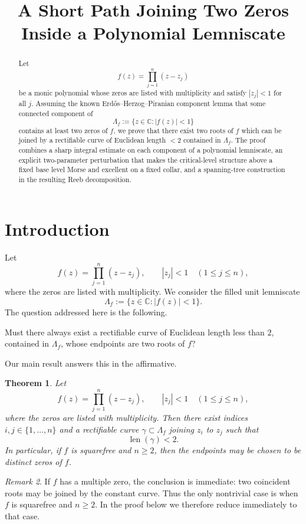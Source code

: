 \documentclass[12pt]{amsart}
\title{A Short Path Joining Two Zeros Inside a Polynomial Lemniscate}
\theoremstyle{definition}
\newtheorem{theorem}{Theorem}
\theoremstyle{remark}
\newtheorem{remark}[theorem]{Remark}
\begin{document}
\begin{abstract}
Let
\[
 f(z)=\prod_{j=1}^n (z-z_j)
\]
be a monic polynomial whose zeros are listed with multiplicity and satisfy $|z_j|<1$ for all $j$.
Assuming the known Erd\H{o}s--Herzog--Piranian component lemma that some connected component of
\[
 \Lambda_f:=\{z\in\mathbb{C}: |f(z)|<1\}
\]
contains at least two zeros of $f$, we prove that there exist two roots of $f$ which can be joined by
 a rectifiable curve of Euclidean length $<2$ contained in $\Lambda_f$. The proof combines a sharp
 integral estimate on each component of a polynomial lemniscate, an explicit two-parameter perturbation
 that makes the critical-level structure above a fixed base level Morse and excellent on a fixed
 collar, and a spanning-tree construction in the resulting Reeb decomposition.
\end{abstract}

\maketitle

\section{Introduction}

Let
\[
 f(z)=\prod_{j=1}^n (z-z_j), \qquad |z_j|<1 \quad (1\le j\le n),
\]
where the zeros are listed with multiplicity. We consider the filled unit lemniscate
\[
 \Lambda_f:=\{z\in\mathbb{C}: |f(z)|<1\}.
\]
The question addressed here is the following.

\medskip
\noindent Must there always exist a rectifiable curve of Euclidean length less than $2$, contained in
$\Lambda_f$, whose endpoints are two roots of $f$?
\medskip

\noindent Our main result answers this in the affirmative.

\begin{theorem}\label{thm:main}
\emph{Let
\[
 f(z)=\prod_{j=1}^n (z-z_j), \qquad |z_j|<1 \quad (1\le j\le n),
\]
where the zeros are listed with multiplicity. Then there exist indices $i,j\in\{1,\dots,n\}$ and a rectifiable
curve $\gamma\subset \Lambda_f$ joining $z_i$ to $z_j$ such that
\[
 \operatorname{len}(\gamma)<2.
\]
In particular, if $f$ is squarefree and $n\ge 2$, then the endpoints may be chosen to be distinct zeros of $f$.}
\end{theorem}

\begin{remark}
If $f$ has a multiple zero, the conclusion is immediate: two coincident roots may be
joined by the constant curve. Thus the only nontrivial case is when $f$ is squarefree and $n\ge 2$.
In the proof below we therefore reduce immediately to that case.
\end{remark}
\end{document}

